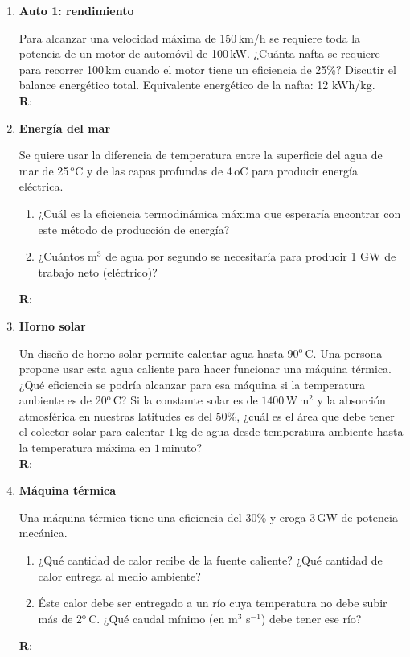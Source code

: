 \documentclass[a4paper,12pt]{article}
\begin{document}
\begin{enumerate}
	\item {\bf{Auto 1: rendimiento}}\label{auto1}
		
		Para alcanzar una velocidad máxima de 150\,km/h se requiere toda la
		potencia de un motor de automóvil de 100\,kW. ¿Cuánta nafta se requiere
		para recorrer 100\,km cuando el motor tiene un eficiencia de 25\%?
		Discutir el balance energético total. Equivalente energético de la
		nafta: 12 kWh/kg.
		\\{\bf{R}}: 
	
	\item {\bf{Energía del mar}}
		
		Se quiere usar la diferencia de temperatura entre la superficie del
		agua de mar de 25\,$^\mathrm{o}$C y de las capas profundas de
		4\,$\mathrm{o}$C para producir energía eléctrica.
		\begin{enumerate}
			\item ¿Cuál es la eficiencia termodinámica máxima que esperaría
				encontrar con este método de producción de energía?
			\item ¿Cuántos m$^3$ de agua por segundo se necesitaría para
				producir 1 GW de trabajo neto (eléctrico)?
		\end{enumerate}
		{\bf{R}}: 
	
	\item {\bf{Horno solar}}
		
		Un diseño de horno solar permite calentar agua hasta
		90$^\mathrm{o}$\,C. Una persona propone usar esta agua caliente para
		hacer funcionar una máquina térmica. ¿Qué eficiencia se podría alcanzar
		para esa máquina si la temperatura ambiente es de 20$^\mathrm{o}$\,C?
		Si la constante solar es de $1400$\,W\,m$^2$ y la absorción atmosférica
		en nuestras latitudes es del $50\%$, ¿cuál es el área que debe tener el
		colector solar para calentar $1$\,kg de agua desde temperatura ambiente
		hasta la temperatura máxima en $1$\,minuto?
		\\{\bf{R}}: 
	
	\item {\bf{Máquina térmica}}
		
		Una máquina térmica tiene una eficiencia del 30\% y eroga $3$\,GW de
		potencia mecánica.
		\begin{enumerate}
			\item ¿Qué cantidad de calor recibe de la fuente caliente? ¿Qué
				cantidad de calor entrega al medio ambiente?
			\item Éste calor debe ser entregado a un río cuya temperatura no
				debe subir más de 2$^\mathrm{o}$\,C. ¿Qué caudal mínimo (en
				m$^3$ s$^{-1}$) debe tener ese río?
		\end{enumerate}
		{\bf{R}}: 
	

\end{enumerate}
\end{document}
